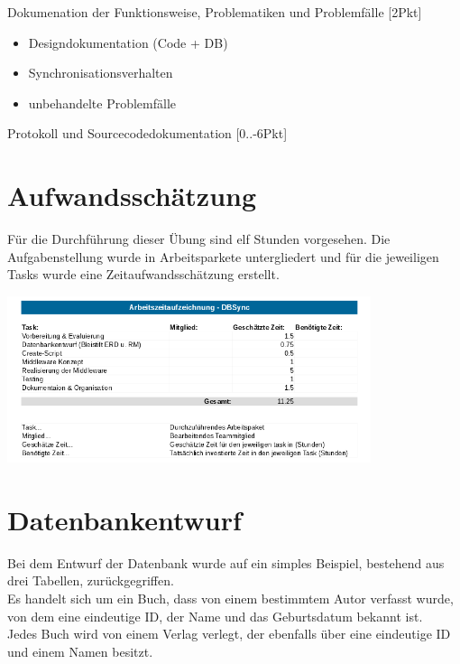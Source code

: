 \documentclass[a4paper]{article}
\begin{document}
	Dokumenation der Funktionsweise, Problematiken und Problemfälle [2Pkt]
	\begin{itemize}
		\item Designdokumentation (Code + DB)
		\item Synchronisationsverhalten
		\item unbehandelte Problemfälle\\
	\end{itemize}
	
	Protokoll und Sourcecodedokumentation [0..-6Pkt]
	
	\newpage
	\section{Aufwandsschätzung}
	Für die Durchführung dieser Übung sind elf Stunden vorgesehen.
	Die Aufgabenstellung wurde in Arbeitsparkete untergliedert und für die jeweiligen Tasks wurde eine Zeitaufwandsschätzung erstellt.\\
	\begin{center}
		\includegraphics[width=0.8\textwidth]{img/timetable.png}
	\end{center}
	
	\newpage
	\section{Datenbankentwurf}
	Bei dem Entwurf der Datenbank wurde auf ein simples Beispiel, bestehend aus drei Tabellen, zurückgegriffen.\\
	Es handelt sich um ein Buch, dass von einem bestimmtem Autor verfasst wurde, von dem eine eindeutige ID, der Name und das Geburtsdatum bekannt ist.\\
	Jedes Buch wird von einem Verlag verlegt, der ebenfalls über eine eindeutige ID und einem Namen besitzt.
\end{document}
